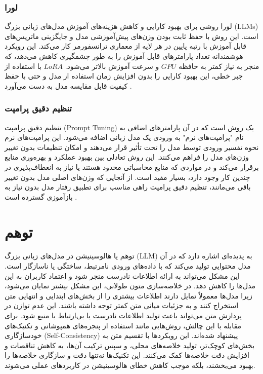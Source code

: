 \subsubsection{لورا}
لورا
روشی برای بهبود کارایی و کاهش هزینه‌های آموزش مدل‌های زبانی بزرگ (LLMs) است. این روش با حفظ ثابت بودن وزن‌های پیش‌آموزشی مدل و جایگزینی ماتریس‌های قابل آموزش با رتبه پایین در هر لایه از معماری ترانسفورمر کار می‌کند. این رویکرد هوشمندانه تعداد پارامترهای قابل آموزش را به طور چشمگیری کاهش می‌دهد، که منجر به نیاز کمتر به حافظه $GPU$ و سرعت آموزش بالاتر می‌شود. $LoRA$ با استفاده از جبر خطی، این بهبود کارایی را بدون افزایش زمان استفاده از مدل و حتی با حفظ کیفیت قابل مقایسه مدل به دست می‌آورد
\cite{hu2021loralowrankadaptationlarge}.

\subsubsection{تنظیم دقیق پرامپت}
تنظیم دقیق پرامپت (Prompt Tuning) یک روش است که در آن پارامترهای اضافی به نام "پرامپت‌های نرم" به ورودی یک مدل زبانی اضافه می‌شود. این پرامپت‌های نرم نحوه تفسیر ورودی توسط مدل را تحت تأثیر قرار می‌دهند و امکان تنظیمات بدون تغییر وزن‌های مدل را فراهم می‌کنند. این روش تعادلی بین بهبود عملکرد و بهره‌وری منابع برقرار می‌کند و در مواردی که منابع محاسباتی محدود هستند یا نیاز به انعطاف‌پذیری در چندین کار وجود دارد، بسیار مفید است. از آنجایی که وزن‌های اصلی مدل بدون تغییر باقی می‌مانند، تنظیم دقیق پرامپت راهی مناسب برای تطبیق رفتار مدل بدون نیاز به بازآموزی گسترده است
\cite{lester2021powerscaleparameterefficientprompt}.



\section{توهم}
توهم یا هالوسینیشن
  در مدل‌های زبانی بزرگ (LLM) به پدیده‌ای اشاره دارد که در آن مدل محتوایی تولید می‌کند که با داده‌های ورودی نامرتبط، ساختگی یا ناسازگار است. این مشکل می‌تواند به ارائه اطلاعات نادرست منجر شود و اعتماد کاربران به این مدل‌ها را کاهش دهد. در خلاصه‌سازی متون طولانی، این مشکل بیشتر نمایان می‌شود، زیرا مدل‌ها معمولاً تمایل دارند اطلاعات بیشتری را از بخش‌های ابتدایی و انتهایی متن استخراج کنند و به جزئیات میانی متن کمتر توجه داشته باشند. این عدم توازن در پردازش متن می‌تواند باعث تولید اطلاعات نادرست یا بی‌ارتباط با منبع شود. برای مقابله با این چالش، روش‌هایی مانند استفاده از پنجره‌های همپوشانی و تکنیک‌های خودسازگاری (Self-Consistency) پیشنهاد شده‌اند. این رویکردها با تقسیم متن به بخش‌های کوچک‌تر، تولید خلاصه‌های محلی، و سپس ترکیب آن‌ها، به کاهش تناقضات و افزایش دقت خلاصه‌ها کمک می‌کنند. این تکنیک‌ها نه‌تنها دقت و سازگاری خلاصه‌ها را بهبود می‌بخشند، بلکه موجب کاهش خطای هالوسینیشن در کاربردهای عملی می‌شوند.

